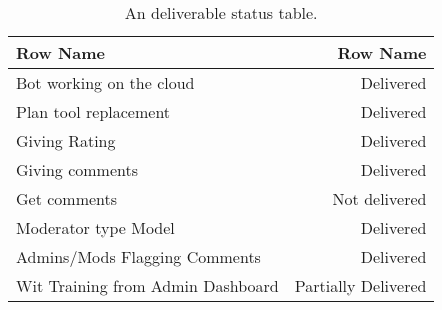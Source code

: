 \documentclass[a4paper]{article}
\begin{document}
\begin{table}[h]
\centering
\begin{tabular}{l|r}
Row Name & Row Name \\\hline
Bot working on the cloud & Delivered \\
Plan tool replacement & Delivered \\
Giving Rating & Delivered \\
Giving comments & Delivered \\
Get comments & Not delivered \\
Moderator type Model & Delivered \\
Admins/Mods Flagging Comments & Delivered \\
Wit Training from Admin Dashboard & Partially Delivered \\

\end{tabular}
\caption{\label{tab:deliverablestatus}An deliverable status table.}
\end{table}
\end{document}
